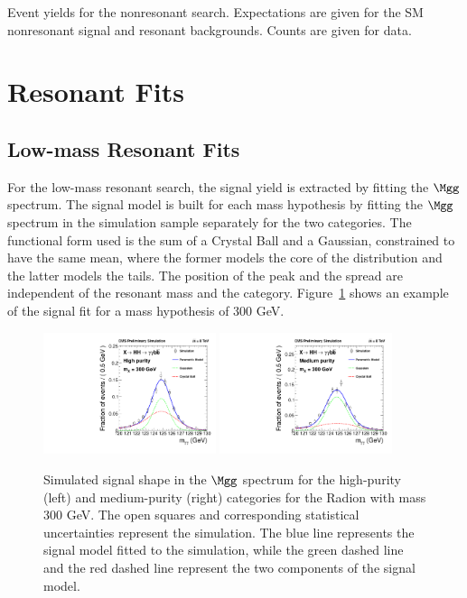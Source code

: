 \begin{table}[htbp!]
  \centering
  \renewcommand{\arraystretch}{1.4}
  \caption{Event yields for the nonresonant search. Expectations are given for
the SM nonresonant signal and resonant backgrounds. Counts are given for data.}
  
  \label{table:yield_data_nonres}
\end{table}

\section{Resonant Fits\label{sec:resfits}}

\subsection{Low-mass Resonant Fits\label{subsec:resfits_lowmass}}

For the low-mass resonant search, the signal yield is extracted by fitting the $\Mgg$ spectrum.
The signal model is built for each mass hypothesis by fitting the $\Mgg$ spectrum
in the simulation sample
separately for the two categories. The functional form used is the sum of a Crystal Ball and
a Gaussian, constrained to have the same mean,
where the former models the core of the distribution and the latter models the
tails. The position of the peak and the spread are independent of the resonant mass and the
category. Figure~\ref{fig:sigfit_300} shows an example of the signal fit for a mass hypothesis of
300 GeV.

\begin{figure}[htbp!]
 \begin{center}
   \includegraphics[width=0.45\textwidth]{figures/results/sigmodel_cat0_300.pdf}
   \includegraphics[width=0.45\textwidth]{figures/results/sigmodel_cat1_300.pdf}
 \end{center}
\caption{Simulated signal shape in the $\Mgg$ spectrum for the high-purity (left) and medium-purity
(right) categories for the Radion with mass 300 GeV. The open squares and corresponding
statistical uncertainties represent the simulation.
The blue line represents the signal model fitted to the simulation, while the green dashed line
and the red dashed line represent the two components of the signal model.}
\label{fig:sigfit_300}
\end{figure}

